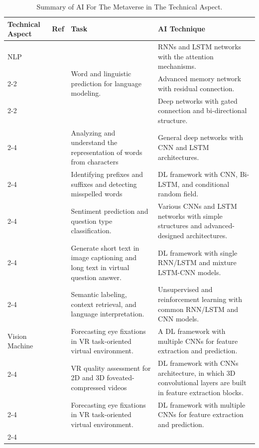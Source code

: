 \documentclass[journal]{IEEEtran}
\begin{document}
\begin{table}[ht!]
\setlength{\tabcolsep}{4pt}
\centering
\caption{Summary of AI For The Metaverse in The Technical Aspect.}

\begin{tabular}{|p{2.10cm}|p{0.75cm}|p{5.75cm}|p{7.85cm}|}
\hline \hline
\textbf{Technical Aspect} & \textbf{Ref} & \textbf{Task} & \textbf{AI Technique} \\ \hline \hline
NLP 
& \cite{daniluk2017frustratingly} & \multirow{3}{5.75cm}{Word and linguistic prediction for language modeling.} & 	RNNs and LSTM networks with the attention mechanisms.\\ \cline{2-2} \cline{4-4}
& \cite{benes2017residual}		& & Advanced memory network with residual connection. \\ \cline{2-2} \cline{4-4}
& \cite{liu2020chinese}		& & Deep networks with gated connection and bi-directional structure.  \\ \cline{2-4}
& \cite{athiwaratkun2017malware}	& Analyzing and understand the representation of words from characters	& General deep networks with CNN and LSTM architectures.\\ \cline{2-4}
& \cite{sharma2020deep}	& Identifying prefixes and suffixes and detecting misspelled words & DL framework with CNN, Bi-LSTM, and conditional random field. \\ \cline{2-4}
& \cite{jin2020multi} & Sentiment prediction and question type classification. & Various CNNs and LSTM networks with simple structures and advanced-designed architectures. \\  \cline{2-4}
& \cite{liu2019bfgan} & Generate short text in image captioning and long text in virtual question answer. & DL framework with single RNN/LSTM and mixture LSTM-CNN models. \\  \cline{2-4}
& \cite{young2018recent} & Semantic labeling, context retrieval, and language interpretation. & Unsupervised and reinforcement learning with common RNN/LSTM and CNN models. 
\\ \hline\hline

Vision Machine
& \cite{hu2021fixationnet} & Forecasting eye fixations in VR task-oriented virtual environment. & A DL framework with multiple CNNs for feature extraction and prediction. \\ \cline{2-4}
& \cite{wu2019virtual}	& \multirow{2}{5.75cm}{VR quality assessment for 2D and 3D foveated-compressed videos} &	\multirow{2}{7.75cm}{DL framework with CNNs architecture, in which 3D convolutional layers are built in feature extraction blocks.} \\
& \cite{jin2021subjective} & &  \\ \cline{2-4}
& \cite{hu2021fixationnet} & Forecasting eye fixations in VR task-oriented virtual environment. & DL framework with multiple CNNs for feature extraction and prediction. \\ \cline{2-4}


\end{tabular}
\end{table}
\end{document}
